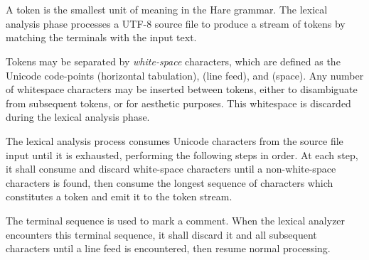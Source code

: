 
\begin{grammar}
\\
	 \\
\end{grammar}

\specsubitem
A token is the smallest unit of meaning in the Hare grammar. The lexical
analysis phase processes a UTF-8 source file to produce a stream of tokens by
matching the terminals with the input text.

\specsubitem
Tokens may be separated by \textit{white-space} characters, which are defined as
the Unicode code-points  (horizontal tabulation), 
(line feed), and  (space). Any number of whitespace characters may
be inserted between tokens, either to disambiguate from subsequent tokens, or
for aesthetic purposes. This whitespace is discarded during the lexical
analysis phase.



\specsubitem
The lexical analysis process consumes Unicode characters from the source file
input until it is exhausted, performing the following steps in order. At each
step, it shall consume and discard white-space characters until a
non-white-space characters is found, then consume the longest sequence of
characters which constitutes a token and emit it to the token stream.

\specsubitem
The terminal sequence \terminal{//} is used to mark a comment. When the lexical
analyzer encounters this terminal sequence, it shall discard it and all
subsequent characters until a line feed  is encountered, then
resume normal processing.

